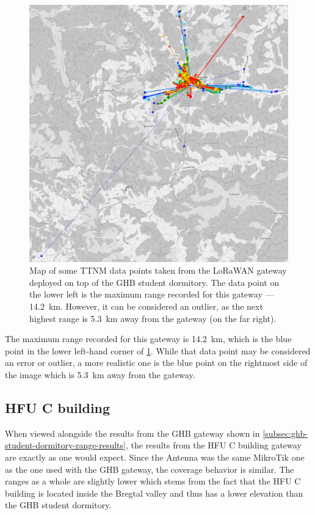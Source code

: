 \begin{figure}[htbp]
    \centering
    \includegraphics[width=1\textwidth]{pictures/ttn-mapper/gateway-ranges/ghb_mikrotik_gw_range.png}
    \caption{
        Map of some \ac{TTNM} data points taken from the \ac{LoRaWAN} gateway deployed on top of the \ac{GHB} student dormitory.
        The data point on the lower left is the maximum range recorded for this gateway --- \SI{14.2}{\kilo\meter}.
        However, it can be considered an outlier, as the next highest range is \SI{5.3}{\kilo\meter} away from the gateway (on the far right).
    }\label{pic:ghb_mikrotik_gw_range}
\end{figure}

The maximum range recorded for this gateway is \SI{14.2}{\kilo\meter}, which is the blue point in the lower left-hand corner of \cref{pic:ghb_mikrotik_gw_range}.
While that data point may be considered an error or outlier, a more realistic one is the blue point on the rightmost side of the image which is \SI{5.3}{\kilo\meter} away from the gateway.

\subsection{\acs{HFU} C building}

When viewed alongside the results from the \ac{GHB} gateway shown in \cref{subsec:ghb-student-dormitory-range-results}, the results from the \ac{HFU} C building gateway are exactly as one would expect.
Since the Antenna was the same MikroTik one as the one used with the \ac{GHB} gateway, the coverage behavior is similar.
The ranges as a whole are slightly lower which stems from the fact that the \ac{HFU} C building is located inside the Bregtal valley and thus has a lower elevation than the \ac{GHB} student dormitory.


